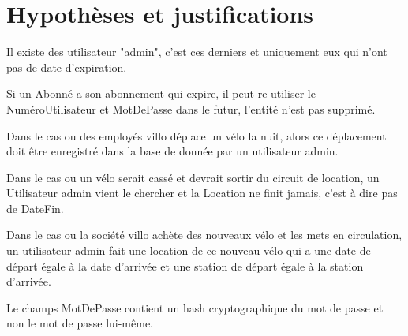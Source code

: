 \documentclass[a4paper,10pt]{article}
\begin{document}
\section{Hypothèses et justifications}

Il existe des utilisateur "admin", c'est ces derniers et uniquement eux qui n'ont pas de date d'expiration.

Si un Abonné a son abonnement qui expire, il peut re-utiliser le NuméroUtilisateur et MotDePasse dans le futur, l'entité n'est pas supprimé.

Dans le cas ou des employés villo déplace un vélo la nuit, alors ce déplacement doit être enregistré dans la base de donnée par un utilisateur admin.

Dans le cas ou un vélo serait cassé et devrait sortir du circuit de location, un Utilisateur admin vient le chercher et la Location ne finit jamais, c'est à dire pas de DateFin.

Dans le cas ou la société villo achète des nouveaux vélo et les mets en circulation, un utilisateur admin fait une location de ce nouveau vélo qui a une date de départ égale à la date d'arrivée et une station de départ égale à la station d'arrivée.

Le champs MotDePasse contient un hash cryptographique du mot de passe et non le mot de passe lui-m\^eme.
\end{document}
